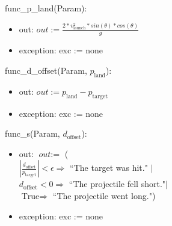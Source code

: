 \documentclass[12pt, titlepage]{article}
\begin{document}
func\_p\_land(Param):
 \begin{itemize}
 \item out: $\textit{out} := \frac{2 * v_{\text{launch}}^2 * sin(\theta) * cos(\theta)}{g}$
 \item exception: exc := none
 \end{itemize}
 
func\_d\_offset(Param, $p_{\text{land}}$):
 \begin{itemize}
 \item out: $\textit{out} := p_{\text{land}} - p_{\text{target}}$
 \item exception: exc := none
 \end{itemize}
 
func\_s(Param, $d_{\text{offset}}$):
 \begin{itemize}
 \item out: $\textit{out} := $ ( \\
$|\frac{d_{\text{offset}}}{p_{\text{target}}}| < \epsilon \Rightarrow$ ``The target was hit." $|$\\
$d_{\text{offset}} < 0 \Rightarrow$ ``The projectile fell short."$|$\\
$\text{True} \Rightarrow$ ``The projectile went long.")
 \item exception: exc := none
 \end{itemize}
\end{document}
